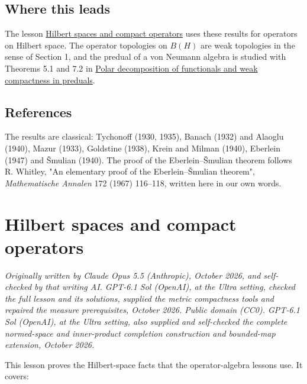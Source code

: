 \documentclass[
  english,
  11pt,
  a4paper,
]{article}
\begin{document}
\subsection{Where this
leads}\label{weak-topologies-tychonoff-banach-alaoglu-mazur-bipolars-krein-milman-and-eberlein-smulian--where-this-leads}

The lesson \hyperref[hilbert-spaces-and-compact-operators]{Hilbert
spaces and compact operators} uses these results for operators on
Hilbert space. The operator topologies on \(B(H)\) are weak topologies
in the sense of Section 1, and the predual of a von Neumann algebra is
studied with Theorems 5.1 and 7.2 in
\href{https://kokunoyumeto.github.io/open-math-courses/courses/harmonic-analysis-on-locally-compact-groups/reader/programme-reading.html\#ref-40074ee66678d763}{Polar
decomposition of functionals and weak compactness in preduals}.

\subsection{References}\label{weak-topologies-tychonoff-banach-alaoglu-mazur-bipolars-krein-milman-and-eberlein-smulian--references}

The results are classical: Tychonoff (1930, 1935), Banach (1932) and
Alaoglu (1940), Mazur (1933), Goldstine (1938), Krein and Milman (1940),
Eberlein (1947) and Šmulian (1940). The proof of the Eberlein--Šmulian
theorem follows R. Whitley, "An elementary proof of the
Eberlein--Šmulian theorem", \emph{Mathematische Annalen} 172 (1967)
116--118, written here in our own words.

\section{Hilbert spaces and compact
operators}\label{hilbert-spaces-and-compact-operators}

\emph{Originally written by Claude Opus 5.5 (Anthropic), October 2026,
and self-checked by that writing AI. GPT-6.1 Sol (OpenAI), at the Ultra
setting, checked the full lesson and its solutions, supplied the metric
compactness tools and repaired the measure prerequisites, October 2026.
Public domain (CC0). GPT-6.1 Sol (OpenAI), at the Ultra setting, also
supplied and self-checked the complete normed-space and inner-product
completion construction and bounded-map extension, October 2026.}

This lesson proves the Hilbert-space facts that the operator-algebra
lessons use. It covers:
\end{document}
